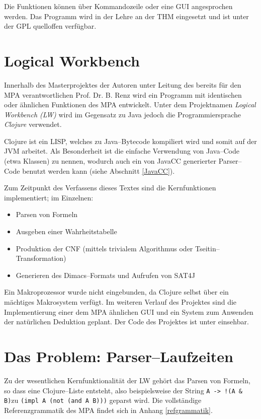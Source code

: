 \documentclass[ngerman,a4paper,abstracton,open=right,twoside=false,toc=listofnumbered,bibtotocnumbered]{scrreprt}
\begin{document}
Die Funktionen können über Kommandozeile oder eine GUI angesprochen werden. Das Programm wird in der Lehre an der THM eingesetzt und ist unter der GPL quelloffen verfügbar.

\section{Logical Workbench}

Innerhalb des Masterprojektes der Autoren unter Leitung des bereits für den MPA verantwortlichen Prof. Dr. B. Renz wird ein Programm mit identischen oder ähnlichen Funktionen des MPA entwickelt. Unter dem Projektnamen \emph{Logical Workbench (LW)} wird im Gegensatz zu Java jedoch die Programmiersprache \emph{Clojure} verwendet.

Clojure ist ein LISP, welches zu Java--Bytecode kompiliert wird und somit auf der JVM arbeitet. Als Besonderheit ist die einfache Verwendung von Java--Code (etwa Klassen) zu nennen, wodurch auch ein von JavaCC generierter Parser--Code benutzt werden kann (siehe Abschnitt \ref{JavaCC}).

Zum Zeitpunkt des Verfassens dieses Textes sind die Kernfunktionen implementiert; im Einzelnen:

\begin{itemize}
	\item Parsen von Formeln
	\item Ausgeben einer Wahrheitstabelle
	\item Produktion der CNF (mittels trivialem Algorithmus oder Tseitin--Transformation)
	\item Generieren des Dimacs--Formats und Aufrufen von SAT4J
\end{itemize}

Ein Makroprozessor wurde nicht eingebunden, da Clojure selbst über ein mächtiges Makrosystem verfügt. Im weiteren Verlauf des Projektes sind die Implementierung einer dem MPA ähnlichen GUI und ein System zum Anwenden der natürlichen Deduktion geplant. Der Code des Projektes ist unter \cite{lw} einsehbar.

\section{Das Problem: Parser--Laufzeiten}

Zu der wesentlichen Kernfunktionalität der LW gehört das Parsen von Formeln, so dass eine Clojure--Liste entsteht, also beispielsweise der String \glqq\lstinline|A -> !(A & B)|\grqq zu \lstinline|(impl A (not (and A B)))| geparst wird. Die vollständige Referenzgrammatik des MPA findet sich in Anhang \ref{refgrammatik}.
\end{document}
